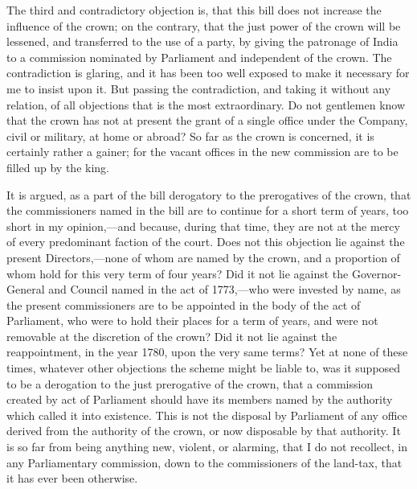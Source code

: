 The third and contradictory objection is, that this bill does not increase the influence of the crown; on the contrary, that the just power of the crown will be lessened, and transferred to the use of a party, by giving the patronage of India to a commission nominated by Parliament and independent of the crown. The contradiction is glaring, and it has been too well exposed to make it necessary for me to insist upon it. But passing the contradiction, and taking it without any relation, of all objections that is the most extraordinary. Do not gentlemen know that the crown has not at present the grant of a single office under the Company, civil or military, at home or abroad? So far as the crown is concerned, it is certainly rather a gainer; for the vacant offices in the new commission are to be filled up by the king.

It is argued, as a part of the bill derogatory to the prerogatives of the crown, that the commissioners named in the bill are to continue for a short term of years, too short in my opinion,—and because, during that time, they are not at the mercy of every predominant faction of the court. Does not this objection lie against the present Directors,—none of whom are named by the crown, and a proportion of whom hold for this very term of four years? Did it not lie against the Governor-General and Council named in the act of 1773,—who were invested by name, as the present commissioners are to be appointed in the body of the act of Parliament, who were to hold their places for a term of years, and were not removable at the discretion of the crown? Did it not lie against the reappointment, in the year 1780, upon the very same terms? Yet at none of these times, whatever other objections the scheme might be liable to, was it supposed to be a derogation to the just prerogative of the crown, that a commission created by act of Parliament should have its members named by the authority which called it into existence. This is not the disposal by Parliament of any office derived from the authority of the crown, or now disposable by that authority. It is so far from being anything new, violent, or alarming, that I do not recollect, in any Parliamentary commission, down to the commissioners of the land-tax, that it has ever been otherwise.

